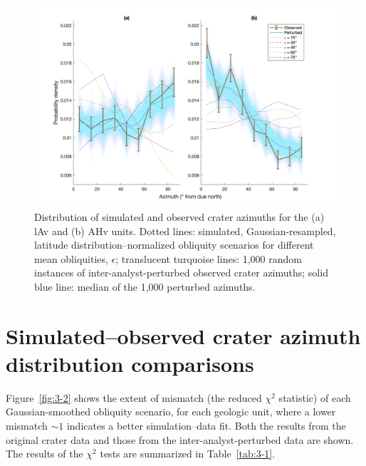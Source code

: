 \documentclass{ucetd}
\begin{document}
\begin{figure}
    \includegraphics[width=\textwidth]{figures/fig3_1.png}
    \caption[Distribution of simulated and observed crater azimuths]{Distribution of simulated and observed crater azimuths for the (a) lAv and (b) AHv units. Dotted lines: simulated, Gaussian-resampled, latitude distribution--normalized obliquity scenarios for different mean obliquities, $\epsilon$; translucent turquoise lines: 1,000 random instances of inter-analyst-perturbed observed crater azimuths; solid blue line: median of the 1,000 perturbed azimuths.}
    \label{fig:3-1}
\end{figure}

\section{Simulated--observed crater azimuth distribution comparisons}
\label{section:3-2}

Figure~\ref{fig:3-2} shows the extent of mismatch (the reduced $\chi^2$ statistic) of each Gaussian-smoothed obliquity scenario, for each geologic unit, where a lower mismatch $\sim 1$ indicates a better simulation--data fit. Both the results from the original crater data and those from the inter-analyst-perturbed data are shown. The results of the $\chi^2$ tests are summarized in Table~\ref{tab:3-1}.
\end{document}
